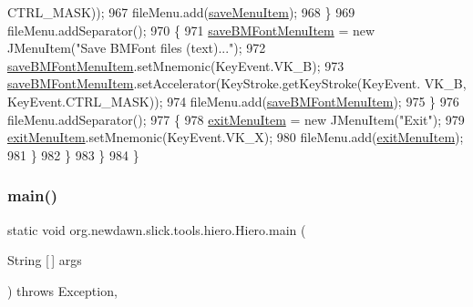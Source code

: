 \begin{DoxyCode}
      CTRL\_MASK));
967                     fileMenu.add(\mbox{\hyperlink{classorg_1_1newdawn_1_1slick_1_1tools_1_1hiero_1_1_hiero_a718e4dc3618321c479640f1444da4964}{saveMenuItem}});
968                 \}
969                 fileMenu.addSeparator();
970                 \{
971                     \mbox{\hyperlink{classorg_1_1newdawn_1_1slick_1_1tools_1_1hiero_1_1_hiero_a5591ce9dfc64eb4e3512ac22813e6a42}{saveBMFontMenuItem}} = \textcolor{keyword}{new} JMenuItem(\textcolor{stringliteral}{"Save BMFont files (text)..."});
972                     \mbox{\hyperlink{classorg_1_1newdawn_1_1slick_1_1tools_1_1hiero_1_1_hiero_a5591ce9dfc64eb4e3512ac22813e6a42}{saveBMFontMenuItem}}.setMnemonic(KeyEvent.VK\_B);
973                     \mbox{\hyperlink{classorg_1_1newdawn_1_1slick_1_1tools_1_1hiero_1_1_hiero_a5591ce9dfc64eb4e3512ac22813e6a42}{saveBMFontMenuItem}}.setAccelerator(KeyStroke.getKeyStroke(KeyEvent.
      VK\_B, KeyEvent.CTRL\_MASK));
974                     fileMenu.add(\mbox{\hyperlink{classorg_1_1newdawn_1_1slick_1_1tools_1_1hiero_1_1_hiero_a5591ce9dfc64eb4e3512ac22813e6a42}{saveBMFontMenuItem}});
975                 \}
976                 fileMenu.addSeparator();
977                 \{
978                     \mbox{\hyperlink{classorg_1_1newdawn_1_1slick_1_1tools_1_1hiero_1_1_hiero_a679b649a97e021351d32b9491e7f135a}{exitMenuItem}} = \textcolor{keyword}{new} JMenuItem(\textcolor{stringliteral}{"Exit"});
979                     \mbox{\hyperlink{classorg_1_1newdawn_1_1slick_1_1tools_1_1hiero_1_1_hiero_a679b649a97e021351d32b9491e7f135a}{exitMenuItem}}.setMnemonic(KeyEvent.VK\_X);
980                     fileMenu.add(\mbox{\hyperlink{classorg_1_1newdawn_1_1slick_1_1tools_1_1hiero_1_1_hiero_a679b649a97e021351d32b9491e7f135a}{exitMenuItem}});
981                 \}
982             \}
983         \}
984     \}
\end{DoxyCode}
\mbox{\label{classorg_1_1newdawn_1_1slick_1_1tools_1_1hiero_1_1_hiero_af2f941178dbc3bb76d6f23c587f421af}} 
\subsubsection{\texorpdfstring{main()}{main()}}
{\footnotesize\ttfamily static void org.\+newdawn.\+slick.\+tools.\+hiero.\+Hiero.\+main (\begin{DoxyParamCaption}\item[{String \mbox{[}$\,$\mbox{]}}]{args }\end{DoxyParamCaption}) throws Exception\hspace{0.3cm}{\ttfamily [inline]}, {\ttfamily [static]}}


